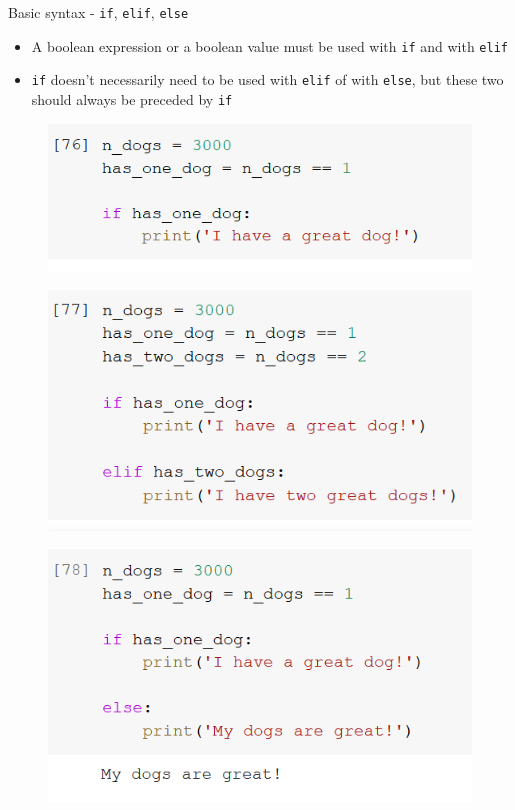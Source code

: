 \documentclass[aspectratio=169]{beamer}
\begin{document}
\begin{frame}{Basic syntax - \texttt{if}, \texttt{elif}, \texttt{else}}

	\begin{itemize}
		\item A boolean expression or a boolean value must be used with \texttt{if} and with \texttt{elif}
		\item \texttt{if} doesn't necessarily need to be used with \texttt{elif} of with \texttt{else}, but these two should always be preceded by \texttt{if}
	\end{itemize}

	\begin{multicols}{3}

		\begin{figure}
			\centering
			\includegraphics[width=\linewidth]{img/if_alone.png}
		\end{figure}
		\begin{figure}
			\centering
			\includegraphics[width=\linewidth]{img/if_elif.png}
		\end{figure}
		\begin{figure}
			\centering
			\includegraphics[width=\linewidth]{img/if_else.png}
		\end{figure}


\end{multicols}
\end{frame}
\end{document}
